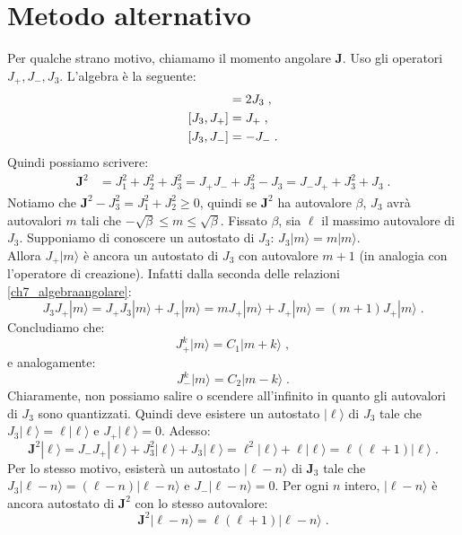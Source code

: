 \documentclass[10pt,a4paper]{report}
\theoremstyle{definition}
\numberwithin{equation}{section}
\newcommand{\ket}{\rangle}
\begin{document}
\section{Metodo alternativo}
Per qualche strano motivo, chiamamo il momento angolare $\mathbf{J}$. Uso gli operatori $J_+,J_-,J_3$. L'algebra è la seguente:
\begin{align}
[J_+,J_-]&= 2J_3 \notag\;, \\
[J_3,J_+]&= J_+ \notag\;, \\
[J_3,J_-]&= -J_-\;. \label{ch7_algebraangolare}
\end{align}
Quindi possiamo scrivere:
\begin{align}
\mathbf{J}^2 &= J_1^2+J_2^2+J_3^2 = J_+J_-+J_3^2-J_3 =  J_-J_++J_3^2+J_3\;.
\end{align}
Notiamo che $\mathbf{J}^2-J_3^2=J_1^2+J_2^2\ge 0$, quindi se $\mathbf{J}^2$ ha autovalore $\beta$, $J_3$ avrà autovalori $m$ tali che $-\sqrt{\beta}\le m\le \sqrt{\beta}$. Fissato $\beta$, sia $\ell$ il massimo autovalore di $J_3$. Supponiamo di conoscere un autostato di $J_3$: $J_3|m\ket=m|m\ket$.\\
Allora $J_+|m\ket$ è ancora un autostato di $J_3$ con autovalore $m+1$ (in analogia con l'operatore di creazione). Infatti dalla seconda delle relazioni \eqref{ch7_algebraangolare}: 
\begin{equation}
J_3J_+|m\ket=J_+J_3|m\ket+J_+|m\ket=mJ_+|m\ket+J_+|m\ket=(m+1)J_+|m\ket\;.
\end{equation}
Concludiamo che:
\begin{equation}
J_+^k|m\ket=C_1|m+k\ket\;,
\end{equation}
e analogamente:
\begin{equation}
J_-^k|m\ket=C_2|m-k\ket\;.
\end{equation}
Chiaramente, non possiamo salire o scendere all'infinito in quanto gli autovalori di $J_3$ sono quantizzati. Quindi deve esistere un autostato $|\ell\ket$ di $J_3$ tale che $J_3|\ell\ket=\ell|\ell\ket$ e $J_+|\ell\ket=0$. Adesso:
\begin{equation}
\mathbf{J}^2|\ell\ket=J_-J_+|\ell\ket+J_3^2|\ell\ket+J_3|\ell\ket=\ell^2|\ell\ket+\ell|\ell\ket=\ell(\ell+1)|\ell\ket\;.
\end{equation}
Per lo stesso motivo, esisterà un autostato $|\ell-n\ket$ di $\mathbf{J}_3$ tale che $J_3|\ell-n\ket=(\ell-n)|\ell-n\ket$ e $J_-|\ell-n\ket=0$. Per ogni $n$ intero, $|\ell-n\ket$ è ancora autostato di $\mathbf{J}^2$ con lo stesso autovalore:
\begin{equation}
\mathbf{J}^2|\ell-n\ket=\ell(\ell+1)|\ell-n\ket\;.
\end{equation}
\end{document}
